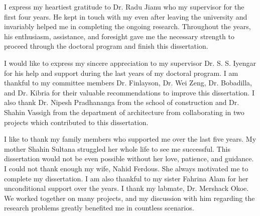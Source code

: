 \begin{acknowledgments}
I express my heartiest gratitude to Dr. Radu Jianu who my supervisor for the first four years. He kept in touch with my even after leaving the university and invariably helped me in completing the ongoing research. Throughout the years, his enthusiasm, assistance, and foresight gave me the necessary strength to proceed through the doctoral program and finish this dissertation. 

I would like to express my sincere appreciation to my supervisor Dr.  S. S. Iyengar for his help and support during the last years of my doctoral program. I am thankful to my committee members Dr. Finlayson, Dr. Wei Zeng, Dr. Bobadilla, and Dr. Kibria for their valuable recommendations to improve this dissertation. I also thank Dr. Nipesh Pradhananga from the school of construction and Dr. Shahin Vassigh from the department of architecture from collaborating in two projects which contributed to this dissertation.

I like to thank my family members who supported me over the last five years. My mother Shahin Sultana struggled her whole life to see me successful. This dissertation would not be even possible without her love, patience, and guidance.  I could not thank enough my wife, Nahid Ferdous. She always motivated me to complete my dissertation. I am also thankful to my sister Fahrina Alam for her unconditional support over the years.  I thank my labmate, Dr. Mershack Okoe. We worked together on many projects, and my discussion with him regarding the research problems greatly benefited me in countless scenarios. 
\end{acknowledgments}